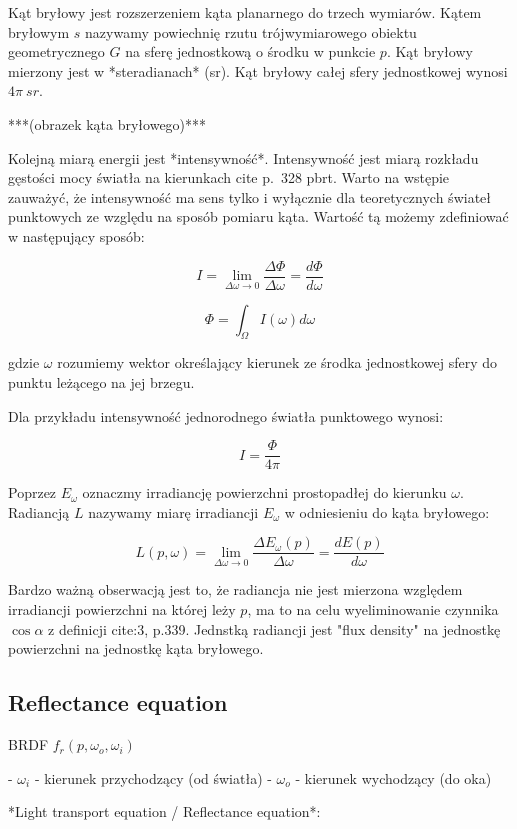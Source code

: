 \documentclass[../main.tex]{subfiles}
\begin{document}
Kąt bryłowy jest rozszerzeniem kąta planarnego do trzech wymiarów. Kątem
bryłowym $s$ nazywamy powiechnię rzutu trójwymiarowego obiektu geometrycznego
$G$ na sferę jednostkową o środku w punkcie $p$. Kąt bryłowy mierzony jest
w *steradianach* (sr). Kąt bryłowy całej sfery jednostkowej wynosi
  $4\pi \:{sr}$.

***(obrazek kąta bryłowego)***

Kolejną miarą energii jest *intensywność*. Intensywność jest miarą rozkładu
gęstości mocy światła na kierunkach cite p.~328 pbrt. Warto na wstępie
zauważyć, że intensywność ma sens tylko i wyłącznie dla teoretycznych świateł
punktowych ze względu na sposób pomiaru kąta. Wartość tą możemy zdefiniować w
następujący sposób:

$$
I = \lim_{\Delta\omega \rightarrow 0} {
    \frac{\Delta\Phi}{\Delta\omega}
} = \frac{d\Phi}{d\omega}
$$

$$
\Phi = \int_{\Omega} {I(\omega) d\omega}
$$

gdzie $\omega$ rozumiemy wektor określający kierunek ze środka jednostkowej
sfery do punktu leżącego na jej brzegu.

Dla przykładu intensywność jednorodnego światła punktowego wynosi:

$$
I = \frac{\Phi}{4\pi}
$$

Poprzez $E_{\omega}$ oznaczmy irradiancję powierzchni prostopadłej do kierunku
$\omega$. Radiancją $L$ nazywamy miarę irradiancji $E_{\omega}$ w odniesieniu
do kąta bryłowego:

$$
L(p, \omega) = \lim_{\Delta\omega \rightarrow 0} {
  \frac{\Delta E_{\omega} (p)}{\Delta\omega}
} =
\frac{d E(p)}{d \omega}
$$

Bardzo ważną obserwacją jest to, że radiancja nie jest mierzona względem
irradiancji powierzchni na której leży $p$, ma to na celu wyeliminowanie
czynnika $\cos \alpha$ z definicji cite:3, p.339. Jednstką radiancji jest "flux
density" na jednostkę powierzchni na jednostkę kąta bryłowego.

\subsection{Reflectance equation}

BRDF $f_r(p, \omega_o, \omega_i)$

- $\omega_i$ - kierunek przychodzący (od światła)
- $\omega_o$ - kierunek wychodzący (do oka)

*Light transport equation / Reflectance equation*:
\end{document}
